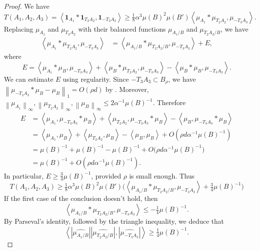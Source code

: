 \documentclass{daj}
\theoremstyle{definition}
\newcommand{\m}[1]{\mu_{#1}}
\newcommand{\mh}[1]{\widehat{\mu_{#1}}}
\newcommand{\ind}[1]{\mathbf{1}_{#1}}
\newcommand{\inner}[2]{\left\langle#1, #2\right\rangle}
\newcommand{\norm}[1]{\left\|#1\right\|}
\begin{document}
\begin{proof}
We have 
\begin{equation*}
T(A_1, A_2, A_3) = \inner{\ind{A_1} * \ind{T_2A_2}}{\ind{-T_3A_3}} \geq \tfrac{1}{8}\alpha^3 \mu(B)^2\mu(B') \inner{\m{A_1} * \m{T_2A_2}}{\m{-T_3A_3}}.
\end{equation*}
Replacing $\m{A_1}$ and $\m{T_2A_2}$ with their balanced functions $\m{A_1/B}$ and $\m{T_2A_2/B}$, we have %
\begin{align*}
\inner{\m{A_1} * \m{T_2A_2}}{\m{-T_3A_3}} &= \inner{\m{A_1/B} * \m{T_2A_2/B}}{\m{-T_3A_3}} + E,
\end{align*}
where
\begin{equation*}
E = \inner{\m{A_1} * \m{B}}{\m{-T_3A_3}}+ \inner{\m{B} * \m{T_2A_2}}{\m{-T_3A_3}}- \inner{\m{B} * \m{B}}{\m{-T_3A_3}}.
\end{equation*}
We can estimate $E$ using regularity. Since $-T_3A_3\subset B_{\rho}$, we have $\norm{\m{-T_3A_3} * \m{B} - \m{B}}_1 = O(\rho d)$ by \cite[Lemma~4.5]{BS}. Moreover, $\norm{\m{A_1}}_{\infty}, \norm{\m{T_2A_2}}_{\infty}, \norm{\m{B}}_{\infty} \leq 2\alpha^{-1}\mu(B)^{-1}$. Therefore
\begin{align*}
E&= \inner{\m{A_1} }{\m{-T_3A_3} * \m{B}} + \inner{ \m{T_2A_2}}{\m{-T_3A_3}* \m{B}}- \inner{\m{B}}{\m{-T_3A_3}* \m{B}}\\
&= \inner{\m{A_1} }{\m{B}} + \inner{ \m{T_2A_2}}{\m{B}}- \inner{\m{B}}{\m{B}} + O(\rho d\alpha^{-1} \mu(B)^{-1})\\
&= \mu(B)^{-1} + \mu(B)^{-1}  - \mu(B)^{-1} +O\big(\rho d\alpha^{-1} \mu(B)^{-1}\big)\\
&= \mu(B)^{-1} + O\left(\rho d\alpha^{-1} \mu(B)^{-1}\right).
\end{align*}
In particular, $E\geq \frac{3}{4}\mu(B)^{-1}$, provided $\rho$ is small enough. Thus 
\begin{equation*}
T(A_1, A_2, A_3) \geq \tfrac{1}{8}\alpha^3 \mu(B)^2\mu(B') \Big(\inner{\m{A_1/B} * \m{T_2A_2/B}}{\m{-T_3A_3}} + \tfrac{3}{4}\mu(B)^{-1} \Big)
\end{equation*}
If the first case of the conclusion doesn't hold, then
\begin{equation*}
\inner{\m{A_1/B} * \m{T_2A_2/B}}{\m{-T_3A_3}} \leq -\tfrac{1}{4} \mu(B)^{-1}.
\end{equation*}
By Parseval's identity, followed by the triangle inequality, we deduce that
\begin{equation*}
\inner{|\mh{A_1/B}| |\mh{T_2A_2/B}|}{|\mh{-T_3A_3}|}\geq \tfrac{1}{4} \mu(B)^{-1}.

\end{equation*}
\end{proof}
\end{document}
